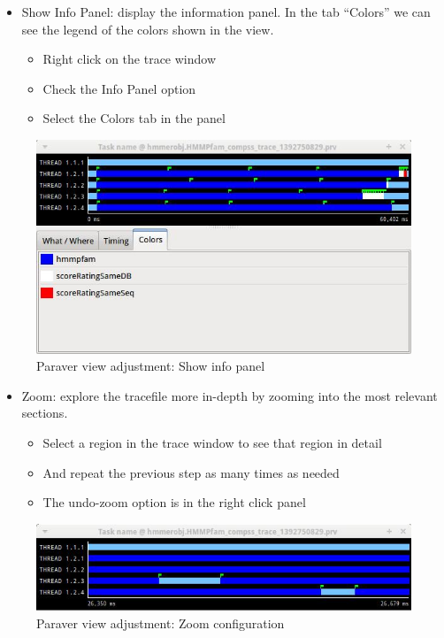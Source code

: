 \begin{itemize}
 \item Show Info Panel: display the information panel. In the tab ``Colors'' we can see the legend of the colors shown in the view.
	\begin{itemize}
	    \item Right click on the trace window
	    \item Check the Info Panel option
	    \item Select the Colors tab in the panel
	\end{itemize}
\end{itemize}

\begin{figure}[ht!]
  \centering
    \includegraphics[width=1.0\textwidth]{./Sections/3_Visualization/Figures/5.jpeg}
    \caption{Paraver view adjustment: Show info panel}
\end{figure}

\begin{itemize}
 \item Zoom: explore the tracefile more in-depth by zooming into the most relevant sections.
	\begin{itemize}
	    \item Select a region in the trace window to see that region in detail
	    \item And repeat the previous step as many times as needed
	    \item The undo-zoom option is in the right click panel
	\end{itemize}
\end{itemize}

\begin{figure}[ht!]
  \centering
    \includegraphics[width=1.0\textwidth]{./Sections/3_Visualization/Figures/6.jpeg}
    \caption{Paraver view adjustment: Zoom configuration}
\end{figure}

